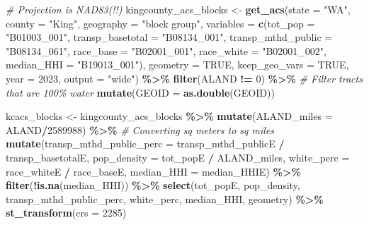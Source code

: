 \documentclass[
  12pt,
]{article}
\newenvironment{Shaded}{\begin{snugshade}}{\end{snugshade}}
\newcommand{\AttributeTok}[1]{\textcolor[rgb]{0.13,0.29,0.53}{#1}}
\newcommand{\CommentTok}[1]{\textcolor[rgb]{0.56,0.35,0.01}{\textit{#1}}}
\newcommand{\ConstantTok}[1]{\textcolor[rgb]{0.56,0.35,0.01}{#1}}
\newcommand{\DecValTok}[1]{\textcolor[rgb]{0.00,0.00,0.81}{#1}}
\newcommand{\FunctionTok}[1]{\textcolor[rgb]{0.13,0.29,0.53}{\textbf{#1}}}
\newcommand{\NormalTok}[1]{#1}
\newcommand{\OtherTok}[1]{\textcolor[rgb]{0.56,0.35,0.01}{#1}}
\newcommand{\SpecialCharTok}[1]{\textcolor[rgb]{0.81,0.36,0.00}{\textbf{#1}}}
\newcommand{\StringTok}[1]{\textcolor[rgb]{0.31,0.60,0.02}{#1}}
\begin{document}
\begin{Shaded}
\begin{Highlighting}[]
\CommentTok{\# Projection is NAD83(!!)}
\NormalTok{kingcounty\_acs\_blocks }\OtherTok{\textless{}{-}} \FunctionTok{get\_acs}\NormalTok{(}\AttributeTok{state =} \StringTok{"WA"}\NormalTok{,}
                                 \AttributeTok{county =} \StringTok{"King"}\NormalTok{,}
                                 \AttributeTok{geography =} \StringTok{"block group"}\NormalTok{,}
                                 \AttributeTok{variables =} \FunctionTok{c}\NormalTok{(}\AttributeTok{tot\_pop =} \StringTok{"B01003\_001"}\NormalTok{,}
                                              \AttributeTok{transp\_basetotal =} \StringTok{"B08134\_001"}\NormalTok{,}
                                              \AttributeTok{transp\_mthd\_public =} \StringTok{"B08134\_061"}\NormalTok{,}
                                              \AttributeTok{race\_base =} \StringTok{"B02001\_001"}\NormalTok{,}
                                              \AttributeTok{race\_white =} \StringTok{"B02001\_002"}\NormalTok{,}
                                              \AttributeTok{median\_HHI =} \StringTok{"B19013\_001"}\NormalTok{),}
                                 \AttributeTok{geometry =} \ConstantTok{TRUE}\NormalTok{,}
                                 \AttributeTok{keep\_geo\_vars =} \ConstantTok{TRUE}\NormalTok{,}
                                 \AttributeTok{year =} \DecValTok{2023}\NormalTok{,}
                                 \AttributeTok{output =} \StringTok{"wide"}\NormalTok{) }\SpecialCharTok{\%\textgreater{}\%}
  \FunctionTok{filter}\NormalTok{(ALAND }\SpecialCharTok{!=} \DecValTok{0}\NormalTok{) }\SpecialCharTok{\%\textgreater{}\%} \CommentTok{\# Filter tracts that are 100\% water}
  \FunctionTok{mutate}\NormalTok{(}\AttributeTok{GEOID =} \FunctionTok{as.double}\NormalTok{(GEOID))}

\NormalTok{kcacs\_blocks }\OtherTok{\textless{}{-}}\NormalTok{ kingcounty\_acs\_blocks }\SpecialCharTok{\%\textgreater{}\%}
  \FunctionTok{mutate}\NormalTok{(}\AttributeTok{ALAND\_miles =}\NormalTok{ ALAND}\SpecialCharTok{/}\DecValTok{2589988}\NormalTok{) }\SpecialCharTok{\%\textgreater{}\%} \CommentTok{\# Converting sq meters to sq miles}
  \FunctionTok{mutate}\NormalTok{(}\AttributeTok{transp\_mthd\_public\_perc =}\NormalTok{ transp\_mthd\_publicE }\SpecialCharTok{/}\NormalTok{ transp\_basetotalE,}
         \AttributeTok{pop\_density =}\NormalTok{ tot\_popE }\SpecialCharTok{/}\NormalTok{ ALAND\_miles,}
         \AttributeTok{white\_perc =}\NormalTok{ race\_whiteE }\SpecialCharTok{/}\NormalTok{ race\_baseE,}
         \AttributeTok{median\_HHI =}\NormalTok{ median\_HHIE) }\SpecialCharTok{\%\textgreater{}\%}
  \FunctionTok{filter}\NormalTok{(}\SpecialCharTok{!}\FunctionTok{is.na}\NormalTok{(median\_HHI)) }\SpecialCharTok{\%\textgreater{}\%}
  \FunctionTok{select}\NormalTok{(tot\_popE,}
\NormalTok{         pop\_density,}
\NormalTok{         transp\_mthd\_public\_perc,}
\NormalTok{         white\_perc,}
\NormalTok{         median\_HHI,}
\NormalTok{         geometry) }\SpecialCharTok{\%\textgreater{}\%}
  \FunctionTok{st\_transform}\NormalTok{(}\AttributeTok{crs =} \DecValTok{2285}\NormalTok{)}


\end{Highlighting}
\end{Shaded}
\end{document}
